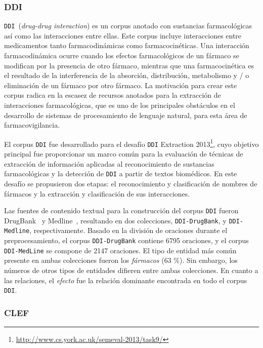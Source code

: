 \subsubsection*{DDI}

\texttt{DDI}~(\textit{drug-drug interaction}) es un corpus anotado con sustancias farmacológicas así como las interacciones entre ellas.
Este corpus incluye interacciones entre medicamentos tanto farmacodinámicas como farmacocinéticas.
Una interacción farmacodinámica ocurre cuando los efectos farmacológicos de un fármaco se modifican por la presencia de otro fármaco, mientras que una farmacocinética es el resultado de la interferencia de la absorción, distribución, metabolismo y / o eliminación de un fármaco por otro fármaco.
La motivación para crear este corpus radica en la escasez de recursos anotados para la extracción de interacciones farmacológicas, que es uno de los principales obstáculos en el desarrollo de sistemas de procesamiento de lenguaje natural, para esta área de farmacovigilancia.

El corpus \texttt{DDI} fue desarrollado para el desafío \texttt{DDI} Extraction 2013\footnote{\url{http://www.cs.york.ac.uk/semeval-2013/task9/}}, cuyo objetivo principal fue proporcionar un marco común para la evaluación de técnicas de extracción de información  aplicadas al reconocimiento de sustancias farmacológicas y la detección de \texttt{DDI} a partir de textos biomédicos.
En este desafío se propusieron dos etapas: el reconocimiento y clasificación de nombres de fármacos y la extracción y clasificación de sus interacciones.

Las fuentes de contenido textual para la construcción del corpus \texttt{DDI} fueron DrugBank~\cite{} y Medline~\cite{}, resultando en dos colecciones, \texttt{DDI-DrugBank}, y \texttt{DDI-Medline}, respectivamente.
Basado en la división de oraciones durante el preprocesamiento, el corpus \texttt{DDI-DrugBank} contiene 6795 oraciones, y el corpus \texttt{DDI-MedLine} se compone de 2147 oraciones.
El tipo de entidad más común presente en ambas colecciones fueron los \textit{fármacos} (63 \%).
Sin embargo, los números de otros tipos de entidades difieren entre ambas colecciones.
En cuanto a las relaciones, el \textit{efecto} fue la relación dominante encontrada en todo el corpus \texttt{DDI}.

\subsubsection*{CLEF}

